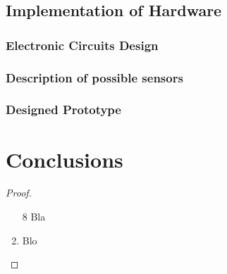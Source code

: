 \documentclass[twoside]{ctuthesis}
\theoremstyle{plain}
\theoremstyle{definition}
\theoremstyle{note}
\begin{document}
\section{Implementation of Hardware}
\subsection{Electronic Circuits Design}
\subsection{Description of possible sensors}
\subsection{Designed Prototype}
\chapter{Conclusions}


\medskip

\begin{proof}\begin{enumerate} \item[8] Bla \item Blo \end{enumerate} \end{proof}

\appendix

\printindex

\appendix

%



\end{document}
